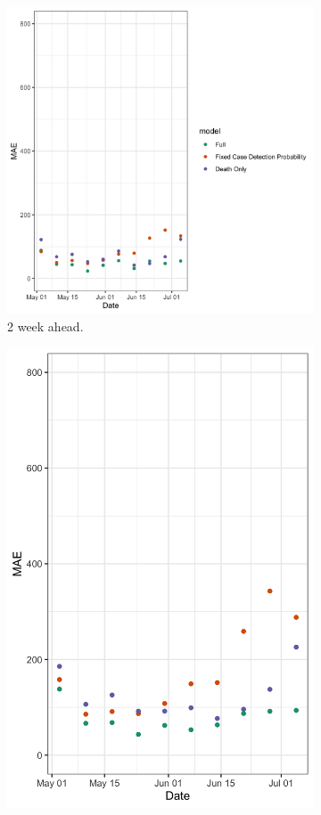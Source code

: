 \documentclass[11pt]{amsart}
\begin{document}
\begin{figure}
\begin{subfigure}{.5\textwidth}
    \includegraphics[scale=.15]{ablation_2.png}
    \caption{2 week ahead.}
\end{subfigure}
\begin{subfigure}{.5\textwidth}
  \centering
    \includegraphics[scale=.15]{ablation_3.png}

\end{subfigure}
\end{figure}
\end{document}
